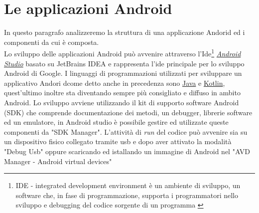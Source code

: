 \section{Le applicazioni Android}
\label{sub:aplicationAndroid}
In questo paragrafo analizzeremo la struttura di una applicazione Andorid ed i componenti da cui è composta.
\\Lo sviluppo delle applicazioni Android può avvenire attraverso l'Ide\footnote{IDE - integrated development environment è un ambiente di sviluppo, un software che, in fase di programmazione, supporta i programmatori nello sviluppo e debugging del codice sorgente di un programma \cite{itwiki:118335792} } \href{https://developer.android.com/studio/index.html}{\textit{Android Studio}} basato su JetBrains IDEA e rappresenta l'ide principale per lo sviluppo Android di Google. I linguaggi di programmazioni utilizzati per sviluppare un applicativo Andori dcome detto anche in precedenza sono \href{https://www.java.com/it/}{Java} e \href{https://kotlinlang.org/}{Kotlin}, quest'ultimo inoltre sta diventando sempre più consigliato e diffuso in ambito Android. Lo sviluppo avviene utilizzando il kit di supporto software Android (SDK) che comprende documentazione dei metodi, un debugger, librerie software ed un emulatore, in Android studio è possibile gestire ed utilizzate queste componenti da "SDK Manager". L'attività di \textit{run} del codice può avvenire sia su un dispositivo fisico collegato tramite usb e dopo aver attivato la modalità "Debug Usb" oppure scaricando ed istallando un immagine di Android nel "AVD Manager - Android virtual devices" 

